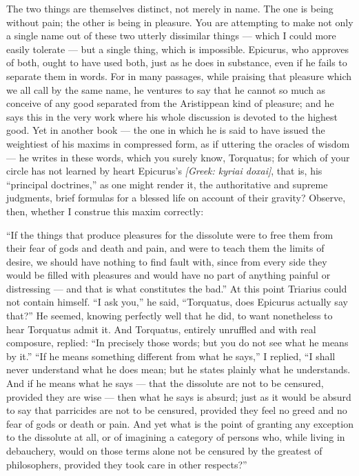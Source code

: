 The two things are themselves distinct, not merely in name. The one is being without pain; the other is being in pleasure. You are attempting to make not only a single name out of these two utterly dissimilar things — which I could more easily tolerate — but a single thing, which is impossible. Epicurus, who approves of both, ought to have used both, just as he does in substance, even if he fails to separate them in words. For in many passages, while praising that pleasure which we all call by the same name, he ventures to say that he cannot so much as conceive of any good separated from the Aristippean kind of pleasure; and he says this in the very work where his whole discussion is devoted to the highest good. Yet in another book — the one in which he is said to have issued the weightiest of his maxims in compressed form, as if uttering the oracles of wisdom — he writes in these words, which you surely know, Torquatus; for which of your circle has not learned by heart Epicurus's \textit{[Greek: kyriai doxai]}, that is, his ``principal doctrines,'' as one might render it, the authoritative and supreme judgments, brief formulas for a blessed life on account of their gravity? Observe, then, whether I construe this maxim correctly:

``If the things that produce pleasures for the dissolute were to free them from their fear of gods and death and pain, and were to teach them the limits of desire, we should have nothing to find fault with, since from every side they would be filled with pleasures and would have no part of anything painful or distressing — and that is what constitutes the bad.'' At this point Triarius could not contain himself. ``I ask you,'' he said, ``Torquatus, does Epicurus actually say that?'' He seemed, knowing perfectly well that he did, to want nonetheless to hear Torquatus admit it. And Torquatus, entirely unruffled and with real composure, replied: ``In precisely those words; but you do not see what he means by it.'' ``If he means something different from what he says,'' I replied, ``I shall never understand what he does mean; but he states plainly what he understands. And if he means what he says — that the dissolute are not to be censured, provided they are wise — then what he says is absurd; just as it would be absurd to say that parricides are not to be censured, provided they feel no greed and no fear of gods or death or pain. And yet what is the point of granting any exception to the dissolute at all, or of imagining a category of persons who, while living in debauchery, would on those terms alone not be censured by the greatest of philosophers, provided they took care in other respects?''

